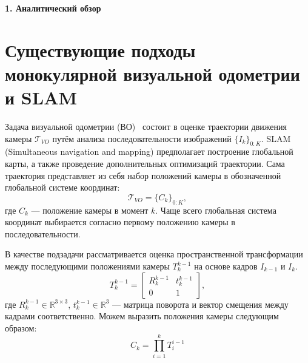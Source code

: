 \newpage
\begin{center}
  \textbf{\large 1. Аналитический обзор }
\end{center}


\section{Существующие подходы монокулярной визуальной одометрии и SLAM}
Задача визуальной одометрии (ВО)~\cite{nister2004visual} состоит 
\cite{aqel2016review}\cite{he2020review} в оценке траектории движения камеры 
$\mathcal{T}_{VO}$ путём анализа последовательности изображений 
$\{I_k\}_{0:K}$. SLAM (Simultaneous navigation and mapping) предполагает 
построение глобальной карты, а также проведение дополнительных оптимизаций траектории.
Сама траектория представляет из себя набор положений камеры 
в обозначенной глобальной системе координат:
\begin{equation}
    \mathcal{T}_{VO} = \{C_k\}_{0:K},
\end{equation}
где $C_k$ --- положение камеры в момент $k$. Чаще всего глобальная 
система координат выбирается согласно первому положению камеры в 
последовательности.

В качестве подзадачи рассматривается оценка пространственной трансформации 
между последующими положениями камеры $T_k^{k-1}$ на основе кадров $I_{k-1}$ 
и $I_k$.
\begin{equation}
    T_k^{k-1} = \begin{bmatrix}R_k^{k-1} & t_k^{k-1} \\ 0 & 1\end{bmatrix},
\end{equation}
где $R_k^{k-1} \in \mathbb{R}^{3\times 3}$, $t_k^{k-1} \in \mathbb{R}^3$ --- 
матрица поворота и вектор смещения между кадрами соответственно. Можем выразить 
положения камеры следующим образом:
\begin{equation}
    C_k = \prod\limits_{i=1}^k T_i^{i-1}
\end{equation}

